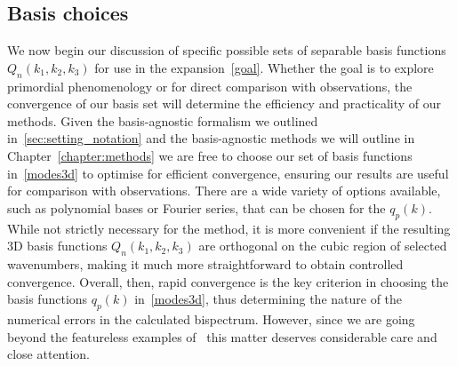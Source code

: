 \subsection{Basis choices}\label{sec:large_non_physical}
We now begin our discussion of specific possible sets of separable
basis functions $Q_n(k_1,k_2,k_3)$
for use in the expansion~\eqref{goal}.
Whether the goal is to explore primordial phenomenology or for direct comparison with observations,
the convergence of our basis set will determine the efficiency and practicality
of our methods.
Given the basis-agnostic formalism we outlined in~\ref{sec:setting_notation} and
the basis-agnostic methods we will outline in Chapter~\ref{chapter:methods}
we are free to choose our set of basis functions in~\eqref{modes3d}
to optimise for efficient convergence,
ensuring our results are useful for comparison with observations. 
There are a wide variety of options available, such as polynomial bases
or Fourier series, that can be chosen for the $q_p(k)$.
While not strictly necessary for the method, it is more convenient if 
the resulting 3D basis functions $Q_n(k_1,k_2,k_3)$
are orthogonal on the cubic region of selected wavenumbers, making it much more straightforward to obtain controlled convergence. Overall, then, rapid convergence is the key criterion in choosing the basis functions $q_p(k)$ in~\eqref{modes3d}, thus determining the nature of the numerical errors in the calculated bispectrum.
However, since we are going beyond the featureless examples of~\cite{Funakoshi}
this matter deserves considerable care and close attention.
